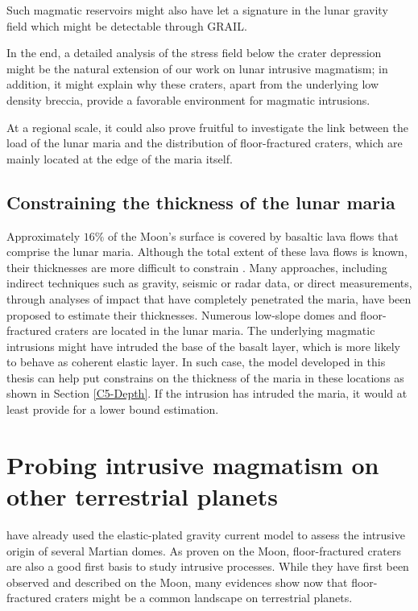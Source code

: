 Such magmatic reservoirs might also have  let a signature in the lunar
gravity field which might be detectable through GRAIL.

In the end,  a detailed analysis of the stress  field below the crater
depression  might  be the  natural  extension  of  our work  on  lunar
intrusive magmatism; in addition, it  might explain why these craters,
apart from  the underlying  low density  breccia, provide  a favorable
environment for magmatic intrusions.

At a regional  scale, it could also prove fruitful  to investigate the
link  between the  load of  the lunar  maria and  the distribution  of
floor-fractured craters, which  are mainly located at the  edge of the
maria itself.

\subsection{Constraining the thickness of the lunar maria}
\label{sec:thickn-lunar-maria}

Approximately $16\%$ of the Moon's surface is covered by basaltic lava
flows  that comprise  the lunar  maria. Although  the total  extent of
these lava  flows is  known, their thicknesses  are more  difficult to
constrain \citep{Thomson:2009eo}. Many  approaches, including indirect
techniques  such  as  gravity,  seismic   or  radar  data,  or  direct
measurements,  through   analyses  of  impact  that   have  completely
penetrated   the  maria,   have  been   proposed  to   estimate  their
thicknesses. Numerous low-slope domes  and floor-fractured craters are
located in the  lunar maria. The underlying  magmatic intrusions might
have intruded  the base of the  basalt layer, which is  more likely to
behave as coherent elastic layer. In such case, the model developed in
this thesis can  help put constrains on the thickness  of the maria in
these locations as shown in  Section \ref{C5-Depth}.  If the intrusion
has intruded  the maria, it would  at least provide for  a lower bound
estimation.

\section{Probing intrusive magmatism on other terrestrial planets}
\label{sec:other-terr-plan}

\citet{Michaut:2013dr}  have already  used the  elastic-plated gravity
current  model  to assess  the  intrusive  origin of  several  Martian
domes. As proven on the Moon,  floor-fractured craters are also a good
first basis to  study intrusive processes. While they  have first been
observed  and described  on the  Moon,  many evidences  show now  that
floor-fractured  craters might  be a  common landscape  on terrestrial
planets.

